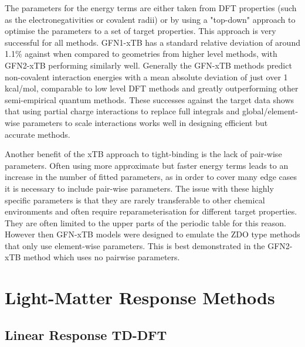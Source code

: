The parameters for the energy terms are either taken from DFT properties (such
as the electronegativities or covalent radii) or by using a "top-down" approach
to optimise the parameters to a set of target properties. This approach is very 
successful for all methods. GFN1-xTB  has a standard relative deviation of around
1.1\% against when compared to geometries from higher level methods, with GFN2-xTB
performing similarly well. Generally the GFN-xTB methods predict non-covalent interaction
energies with a mean absolute deviation of just over 1 kcal/mol, comparable to low
level DFT methods and greatly outperforming other semi-empirical quantum methods.
These successes against the target data shows that using partial charge interactions 
to replace full integrals and global/element-wise parameters to scale interactions
works well in designing efficient but accurate methods.

Another benefit of the xTB approach to tight-binding is the lack of pair-wise parameters.
Often using more approximate but faster energy terms leads to an increase in the
number of fitted parameters, as in order to cover many edge cases it is necessary
to include pair-wise parameters. The issue with these highly specific parameters 
is that they are rarely transferable to other chemical environments and often require
reparameterisation for different target properties. They are often limited to the 
upper parts of the periodic table for this reason. However then GFN-xTB models were
designed to emulate the ZDO type methods that only use element-wise parameters.
This is best demonstrated in the GFN2-xTB method which uses no pairwise parameters.

\section{Light-Matter Response Methods}
\label{sec:response_theories}

\subsection{Linear Response TD-DFT}
\label{subsec:tddft}


